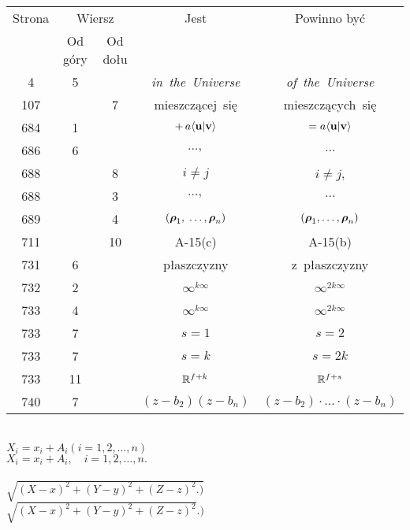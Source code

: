 \documentclass[a4paper,11pt]{article}
\numberwithin{equation}{section}
\begin{document}
\newpage



\begin{center}

  \begin{tabular}{|c|c|c|c|c|}
    \hline
    Strona & \multicolumn{2}{c|}{Wiersz} & Jest
                              & Powinno być \\ \cline{2-3}
    & Od góry & Od dołu & & \\
    \hline
    4   &  5 & & \textit{in~the~Universe} & \textit{of~the~Universe} \\
    107 & &  7 & mieszczącej~się & mieszczących~się \\
    684 &  1 & & $+\, a \langle \mathbf{u} | \mathbf{v} \rangle$
           & $= a \langle \mathbf{u} | \mathbf{v} \rangle$ \\
    686 &  6 & & $\ldots,$ & $\ldots$ \\
    688 & &  8 & $i \neq j$ & $i \neq j$, \\
    688 & &  3 & $\ldots,$ & $\ldots$ \\
    689 & &  4 & $( \boldsymbol{\rho}_{ 1 },\; \ldots, \boldsymbol{\rho}_{ n } )$
           & $( \boldsymbol{\rho}_{ 1 }, \ldots, \boldsymbol{\rho}_{ n } )$ \\
    711 & & 10 & A-15(c) & A-15(b) \\
    731 &  6 & & płaszczyzny & z~płaszczyzny \\
    732 &  2 & & $\infty^{ k \infty }$ & $\infty^{ 2 k \infty }$ \\
    733 &  4 & & $\infty^{ k \infty }$ & $\infty^{ 2 k \infty }$ \\
    733 &  7 & & $s = 1$ & $s = 2$ \\
    733 &  7 & & $s = k$ & $s = 2k$ \\
    733 & 11 & & $\mathbb{R}^{ f + k }$ & $\mathbb{R}^{ f + s }$ \\
    740 &  7 & & $( z - b_{ 2 } )( z - b_{ n } )$
    & $( z - b_{ 2 } ) \cdot \ldots \cdot ( z - b_{ n } )$ \\
    \hline
  \end{tabular}

\end{center}

\VerSpaceTwo


\noindent
{} \\
\Jest $X_{ i } = x_{ i } + A_{ i } ( i = 1, 2, \ldots, n )$ \\
\PowinnoByc $X_{ i } = x_{ i } + A_{ i }, \quad i = 1, 2, \ldots, n.$ \\
 \\[0.2em]
\Jest $\sqrt{ ( X - x )^{ 2 } + ( Y - y )^{ 2 } + ( Z - z )^{ 2 } .) }$
\\[0.4em]
\PowinnoByc $\sqrt{ ( X - x )^{ 2 } + ( Y - y )^{ 2 } + ( Z - z )^{ 2 } }.)$
\end{document}
